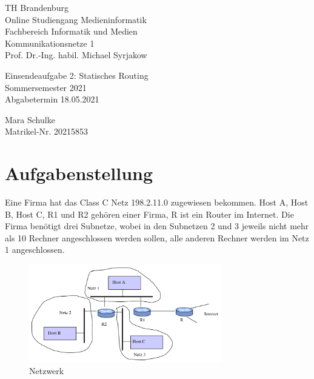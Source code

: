 \documentclass{article}
\begin{document}
\begin{titlepage}
	\begin{flushleft}
		TH Brandenburg \\
		Online Studiengang Medieninformatik \\
		Fachbereich Informatik und Medien \\
		Kommunikationsnetze 1 \\
		Prof. Dr.-Ing. habil. Michael Syrjakow
	\end{flushleft}

	\vfill

	\begin{center}
		\Large{Einsendeaufgabe 2: Statisches Routing}\\[0.5em]
		\large{Sommersemester 2021}\\[0.25em]
		\large{Abgabetermin 18.05.2021}
	\end{center}

	\vfill

	\begin{flushright}
		Mara Schulke \\
		Matrikel-Nr. 20215853
	\end{flushright}
\end{titlepage}

\newpage

\section*{Aufgabenstellung}

Eine Firma hat das Class C Netz 198.2.11.0 zugewiesen bekommen. Host A, Host B, Host C, R1 und R2 gehören
einer Firma, R ist ein Router im Internet. Die Firma benötigt drei Subnetze, wobei in den Subnetzen 2 und
3 jeweils nicht mehr als 10 Rechner angeschlossen werden sollen, alle anderen Rechner werden im Netz 1
angeschlossen.

\begin{figure}[ht]
	\includegraphics[width=0.75\textwidth]{plain}
	\centering
	\caption{Netzwerk}
\end{figure}
\end{document}
